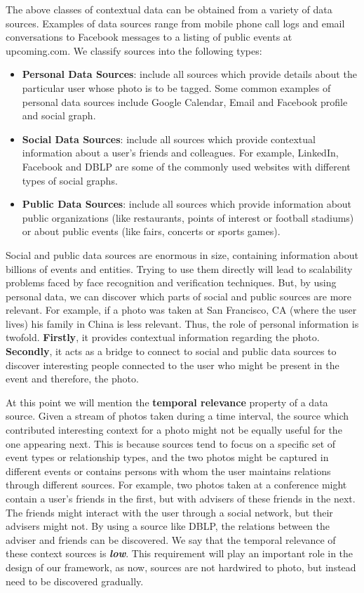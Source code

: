 The above classes of contextual data can be obtained from a variety of data sources. Examples of data sources range from mobile phone call logs and email conversations to Facebook messages to a listing of public events at upcoming.com. We classify sources into the following types:

\begin{itemize}
\item \textbf{Personal Data Sources}: include all sources which provide details about the particular user whose photo is to be tagged. Some common examples of personal data sources include Google Calendar, Email and Facebook profile and social graph.
\item \textbf{Social Data Sources}: include all sources which provide contextual information about a user's friends and colleagues. For example, LinkedIn, Facebook and DBLP are some of the commonly used websites with different types of social graphs.
\item \textbf{Public Data Sources}: include all sources which provide information about public organizations (like restaurants, points of interest or football stadiums) or about public events (like fairs, concerts or sports games).
\end{itemize}

Social and public data sources are enormous in size, containing information about billions of events and entities. Trying to use them directly will lead to scalability problems faced by face recognition and verification techniques. But, by using personal data, we can discover which parts of social and public sources are more relevant. For example, if a photo was taken at San Francisco, CA (where the user lives) his family in China is less relevant. Thus, the role of personal information is twofold. \textbf{Firstly}, it provides contextual information regarding the photo. \textbf{Secondly}, it acts as a bridge to connect to social and public data sources to discover interesting people connected to the user who might be present in the event and therefore, the photo.

At this point we will mention the \textbf{temporal relevance} property of a data source. Given a stream of photos taken during a time interval, the source which contributed interesting context for a photo might not be equally useful for the one appearing next. This is because sources tend to focus on a specific set of event types or relationship types, and the two photos might be captured in different events or contains persons with whom the user maintains relations through different sources. For example, two photos taken at a conference might contain a user's friends in the first, but with advisers of these friends in the next. The friends might interact with the user through a social network, but their advisers might not. By using a source like DBLP, the relations between the adviser and friends can be discovered. We say that the temporal relevance of these context sources is \textbf{\textit{low}}. This requirement will play an important role in the design of our framework, as now, sources are not hardwired to photo, but instead need to be discovered gradually.
